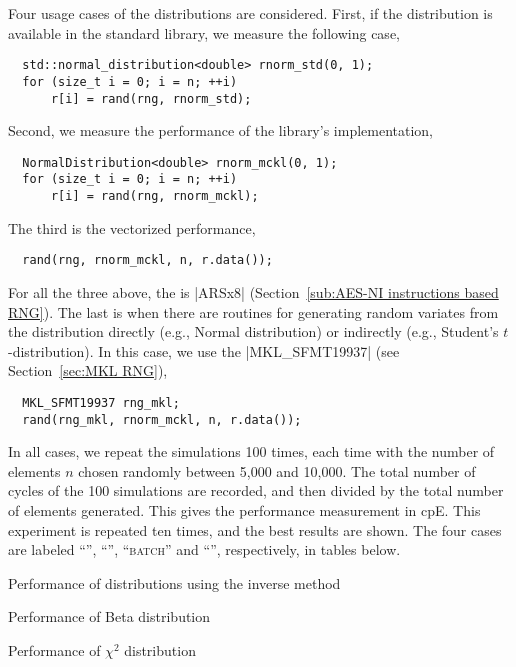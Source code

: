 Four usage cases of the distributions are considered. First, if the
distribution is available in the standard library, we measure the following
case,
\begin{Verbatim}
  std::normal_distribution<double> rnorm_std(0, 1);
  for (size_t i = 0; i = n; ++i)
      r[i] = rand(rng, rnorm_std);
\end{Verbatim}
Second, we measure the performance of the library's implementation,
\begin{Verbatim}
  NormalDistribution<double> rnorm_mckl(0, 1);
  for (size_t i = 0; i = n; ++i)
      r[i] = rand(rng, rnorm_mckl);
\end{Verbatim}
The third is the vectorized performance,
\begin{Verbatim}
  rand(rng, rnorm_mckl, n, r.data());
\end{Verbatim}
For all the three above, the \rng is |ARSx8| (Section~\ref{sub:AES-NI
instructions based RNG}). The last is when there are \mkl routines for
generating random variates from the distribution directly (e.g., Normal
distribution) or indirectly (e.g., Student's $t$-distribution). In this case,
we use the \rng{} |MKL_SFMT19937| (see Section~\ref{sec:MKL RNG}),
\begin{Verbatim}
  MKL_SFMT19937 rng_mkl;
  rand(rng_mkl, rnorm_mckl, n, r.data());
\end{Verbatim}
In all cases, we repeat the simulations 100 times, each time with the number of
elements $n$ chosen randomly between 5,000 and 10,000. The total number of
cycles of the 100 simulations are recorded, and then divided by the total
number of elements generated. This gives the performance measurement in cpE.
This experiment is repeated ten times, and the best results are shown. The four
cases are labeled ``\std'', ``\mckl'', ``\textsc{batch}'' and ``\mkl'',
respectively, in tables below.

\begin{table}
  \caption{Performance of distributions using the inverse method}
  \label{tab:Performance of distributions using the inverse method}
\end{table}

\begin{table}
  \caption{Performance of Beta distribution}
  \label{tab:Performance of Beta distribution}
\end{table}

\begin{table}
  \caption{Performance of $\chi^2$ distribution}
  \label{tab:Performance of chi-squared distribution}
\end{table}

